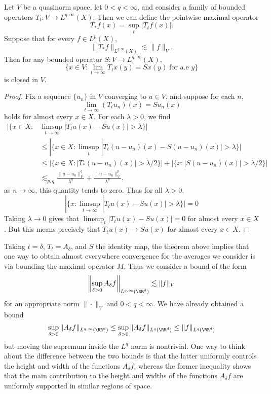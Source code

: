 \begin{theorem}
  Let $V$ be a quasinorm space, let $0 < q < \infty$, and consider a family of bounded operators $T_t: V \to L^{q,\infty}(X)$. Then we can define the pointwise maximal operator
  \[ T_* f(x) = \sup_t |T_t f(x)|. \]
  Suppose that for every $f \in L^p(X)$,
  \[ \| T_* f \|_{L^{q,\infty}(X)} \lesssim \| f \|_V. \]
  Then for any bounded operator $S: V \to L^{q,\infty}(X)$,
  \[ \{ x \in V : \lim_{t \to \infty} T_t x(y) = Sx(y)\; \text{for a.e $y$} \} \]
  is closed in $V$.
\end{theorem}
\begin{proof}
  Fix a sequence $\{ u_n \}$ in $V$ converging to $u \in V$, and suppose for each $n$,
  \[ \lim_{t \to \infty} (T_t u_n)(x) = Su_n(x) \]
  holds for almost every $x \in X$. For each $\lambda > 0$, we find
  \begin{align*}
    |\{ x \in X: &\limsup_{t \to \infty} |T_t u(x) - Su(x)| > \lambda \}|\\
    &\leq |\{ x \in X: \limsup_t |T_t(u - u_n)(x) - S(u - u_n)(x)| > \lambda \}|\\
    &\leq |\{ x \in X : |T_*(u - u_n)(x)| > \lambda/2 \}| + | \{ x: |S(u - u_n)(x)| > \lambda/2 \} |\\
    &\lesssim_{p,q} \frac{\| u - u_n \|_V^q}{\lambda^q} + \frac{\| u - u_n \|_V^p}{\lambda^p}.
  \end{align*}
  as $n \to \infty$, this quantity tends to zero. Thus for all $\lambda > 0$,
  \[ |\{ x: \limsup_{t \to \infty} |T_t u(x) - Su(x)| > \lambda \}| = 0 \]
  Taking $\lambda \to 0$ gives that $\limsup_t |T_t u(x) - Su(x)| = 0$ for almost every $x \in X$. But this means precisely that $T_tu(x) \to Su(x)$ for almost every $x \in X$.
\end{proof}

Taking $t = \delta$, $T_t = A_\delta$, and $S$ the identity map, the theorem above implies that one way to obtain almost everywhere convergence for the averages we consider is via bounding the maximal operator $M$. Thus we consider a bound of the form
%
\[ \left\| \sup_{\delta > 0} A_\delta f \right\|_{L^{q,\infty}(\RR^d)} \lesssim \| f \|_V \]
%
for an appropriate norm $\| \cdot \|_V$ and $0 < q < \infty$. We have already obtained a bound
%
\[ \sup_{\delta > 0} \| A_\delta f \|_{L^{q,\infty}(\RR^d)} \leq \sup_{\delta > 0} \| A_\delta f \|_{L^q(\RR^d)} \leq \| f \|_{L^q(\RR^d)} \]
%
but moving the supremum inside the $L^q$ norm is nontrivial. One way to think about the difference between the two bounds is that the latter uniformly controls the height and width of the functions $A_\delta f$, whereas the former inequality shows that the main contribution to the height and widths of the functions $A_\delta f$ are uniformly supported in similar regions of space.

